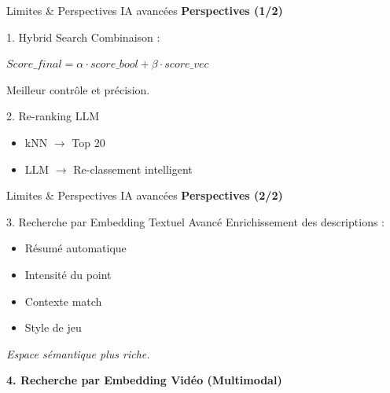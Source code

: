 \documentclass[aspectratio=169, 11pt]{beamer}
\begin{document}
\begin{frame}{Limites \& Perspectives IA avancées}
    \textbf{\Large Perspectives (1/2)}
    \vspace{0.4cm}
    
    \begin{block}{1. Hybrid Search}
        Combinaison : 
        \vspace{0.2cm}
        \centerline{$ Score\_final = \alpha \cdot score\_bool + \beta \cdot score\_vec $}
        \vspace{0.2cm}
        \textrightarrow{} Meilleur contrôle et précision.
    \end{block}
    
    \vspace{0.6cm}
    
    \begin{block}{2. Re-ranking LLM}
        \begin{itemize}
            \item kNN $\to$ Top 20
            \item LLM $\to$ Re-classement intelligent
        \end{itemize}
    \end{block}
\end{frame}

\begin{frame}{Limites \& Perspectives IA avancées}
    \textbf{\Large Perspectives (2/2)}
    \vspace{0.4cm}
    
    \begin{block}{3. Recherche par Embedding Textuel Avancé}
        Enrichissement des descriptions :
        \begin{itemize}
            \item Résumé automatique
            \item Intensité du point
            \item Contexte match
            \item Style de jeu
        \end{itemize}
        \vspace{0.2cm}
        \textrightarrow{} \textit{Espace sémantique plus riche.}
    \end{block}
    
    \vspace{0.6cm}
    
    \textbf{4. Recherche par Embedding Vidéo (Multimodal)}
\end{frame}
\end{document}
